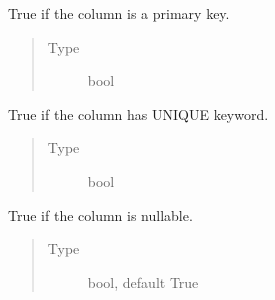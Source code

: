 \documentclass[letterpaper,10pt,english]{sphinxmanual}
\begin{document}
\begin{fulllineitems}
\begin{fulllineitems}
\begin{quote}
\begin{description}
\end{description}\end{quote}

\end{fulllineitems}


\begin{fulllineitems}
\label{\detokenize{model:mini_sql.model.column.Column.__primary_key}}
\sphinxAtStartPar
True if the column is a primary key.
\begin{quote}\begin{description}
\item[{Type}] \leavevmode
\sphinxAtStartPar
bool

\end{description}\end{quote}

\end{fulllineitems}


\begin{fulllineitems}
\label{\detokenize{model:mini_sql.model.column.Column.__unique}}
\sphinxAtStartPar
True if the column has UNIQUE keyword.
\begin{quote}\begin{description}
\item[{Type}] \leavevmode
\sphinxAtStartPar
bool

\end{description}\end{quote}

\end{fulllineitems}


\begin{fulllineitems}
\label{\detokenize{model:mini_sql.model.column.Column.__nullable}}
\sphinxAtStartPar
True if the column is nullable.
\begin{quote}\begin{description}
\item[{Type}] \leavevmode
\sphinxAtStartPar
bool, default True


\end{description}
\end{quote}
\end{fulllineitems}
\end{fulllineitems}
\end{document}
